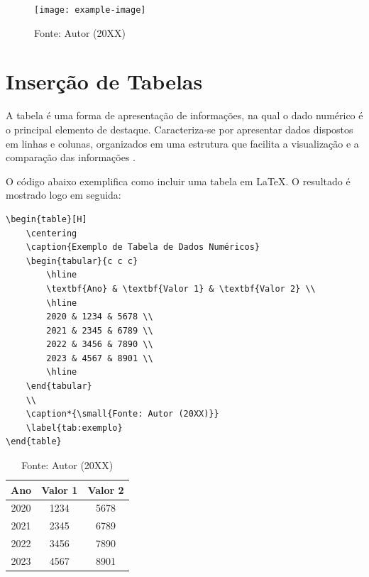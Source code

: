 \begin{apendicesenv}
\begin{figure}[H]
    \centering
    \caption{Legenda da imagem}
    \texttt{[image: example-image]}
    \\
    \caption*{\small{Fonte: Autor (20XX)}}
    \label{fig:exemplo}
\end{figure}

\section*{Inserção de Tabelas}

A tabela é uma forma  de apresentação de informações, na qual o dado numérico é o principal elemento de destaque. Caracteriza-se por apresentar dados dispostos em linhas e colunas, organizados em uma estrutura que facilita a visualização e a comparação das informações \cite{ManualIBGE}. 

O código abaixo exemplifica como incluir uma tabela em \LaTeX. O resultado é mostrado logo em seguida:

\begin{verbatim}
\begin{table}[H]
    \centering
    \caption{Exemplo de Tabela de Dados Numéricos}
    \begin{tabular}{c c c}
        \hline
        \textbf{Ano} & \textbf{Valor 1} & \textbf{Valor 2} \\
        \hline
        2020 & 1234 & 5678 \\
        2021 & 2345 & 6789 \\
        2022 & 3456 & 7890 \\
        2023 & 4567 & 8901 \\
        \hline
    \end{tabular}
    \\
    \caption*{\small{Fonte: Autor (20XX)}}
    \label{tab:exemplo}
\end{table}
\end{verbatim}

\begin{table}[H]
    \centering
    \caption{Exemplo de Tabela de Dados Numéricos}
    \begin{tabular}{c c c}
        \hline
        \textbf{Ano} & \textbf{Valor 1} & \textbf{Valor 2} \\
        \hline
        2020 & 1234 & 5678 \\
        2021 & 2345 & 6789 \\
        2022 & 3456 & 7890 \\
        2023 & 4567 & 8901 \\
        \hline
    \end{tabular}
    \\
    \caption*{\small{Fonte: Autor (20XX)}}
    \label{tab:exemplo}
\end{table}


\end{apendicesenv}
